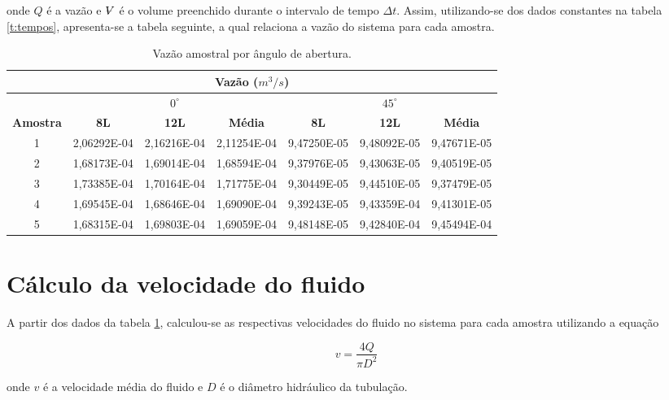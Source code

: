 onde $Q$ é a vazão e $\Vol$ é o volume preenchido durante o intervalo de tempo
$\Delta t$. Assim, utilizando-se dos dados constantes na tabela \ref{t:tempos},
apresenta-se a tabela seguinte, a qual relaciona a vazão do sistema para cada
amostra.

\begin{table}[H]
\centering
\caption{Vazão amostral por ângulo de abertura.}
\label{t:vazao}
\begin{tabular}{|c|c|c|c|c|c|c|}
\hline
\multicolumn{7}{|c|}{\textbf{Vazão ($m^3/s$)}}                                                               \\ \hline
\textbf{}        & \multicolumn{3}{c|}{\textbf{$0^\circ$}}     & \multicolumn{3}{c|}{\textbf{$45^\circ$}}    \\ \hline
\textbf{Amostra} & \textbf{8L} & \textbf{12L} & \textbf{Média} & \textbf{8L} & \textbf{12L} & \textbf{Média} \\ \hline
1                & 2,06292E-04 & 2,16216E-04  & 2,11254E-04    & 9,47250E-05 & 9,48092E-05  & 9,47671E-05    \\ \hline
2                & 1,68173E-04 & 1,69014E-04  & 1,68594E-04    & 9,37976E-05 & 9,43063E-05  & 9,40519E-05    \\ \hline
3                & 1,73385E-04 & 1,70164E-04  & 1,71775E-04    & 9,30449E-05 & 9,44510E-05  & 9,37479E-05    \\ \hline
4                & 1,69545E-04 & 1,68646E-04  & 1,69090E-04    & 9,39243E-05 & 9,43359E-04  & 9,41301E-05    \\ \hline
5                & 1,68315E-04 & 1,69803E-04  & 1,69059E-04    & 9,48148E-05 & 9,42840E-04  & 9,45494E-04    \\ \hline
\end{tabular}
\end{table}

\section{Cálculo da velocidade do fluido}
\label{sec:VelFluido}

A partir dos dados da tabela \ref{t:vazao}, calculou-se as respectivas
velocidades do fluido no sistema para cada amostra utilizando a equação

\begin{equation}
  v = \frac{4 Q}{\pi D^2}
\end{equation}

onde $v$ é a velocidade média do fluido e $D$ é o diâmetro hidráulico da
tubulação.

